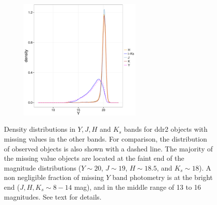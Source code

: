 \begin{figure}[ht!]
\begin{subfigure}[t]{0.45\textwidth}
      \includegraphics[page=4,height=6cm]{background/Figures/MissingDistributionsDDR2.pdf}
    \end{subfigure}
\caption{Density distributions in $Y,J,H$ and $K_s$ bands for \gls{ddr2} objects with missing values in the other bands. For comparison, the distribution of observed objects is also shown with a dashed line. The majority of the missing value objects are located at the faint end of the magnitude distributions ($Y \sim 20$, $J \sim 19$, $H\sim18.5$, and $K_s \sim 18$). A non negligible fraction of missing  $Y$ band photometry is at the bright end ($J,H,K_s \sim 8 - 14$ mag), and in the middle range of 13 to 16 magnitudes. See text for details.}
\label{fig:NAsDDR2}
\end{figure}

